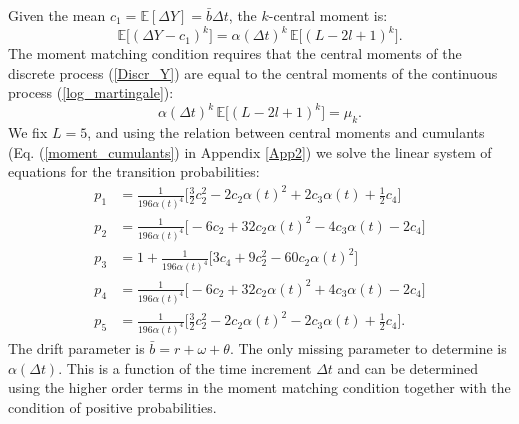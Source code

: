 \documentclass[]{interact}
\newcommand{\numberset}{\mathbb}
\newcommand{\E}{\numberset{E}}
\theoremstyle{plain}%
\theoremstyle{definition}
\theoremstyle{remark}
\begin{document}
Given the mean $c_1 = \E[\Delta Y] = \bar b \Delta t$, the $k$-central moment is:
\begin{equation}\label{higher_moments}
 \E \bigl[ (\Delta Y - c_1)^k \bigr] = \alpha(\Delta t)^k\, \E \bigl[ (L-2l+1)^{k} \bigr].
\end{equation}
The moment matching condition requires that the central moments of the discrete process (\ref{Discr_Y}) 
are equal to the central moments
of the continuous process (\ref{log_martingale}):
\begin{equation}\label{moment_matching}
 \alpha(\Delta t)^k\, \E \bigl[ (L-2l+1)^{k} \bigr] = \mu_k.
\end{equation}
We fix $L=5$, and using the relation between central moments and cumulants (Eq. (\ref{moment_cumulants}) in Appendix \ref{App2}) 
we solve the linear system of equations for the transition probabilities:
\begin{align}\label{probabilities1}
 p_1 &= \frac{1}{196 \alpha(t)^4} \biggl[ \frac{3}{2} c_2^2 -2 c_2\alpha(t)^2 + 2 c_3 \alpha(t) +\frac{1}{2} c_4  \biggr] \\ \nonumber
 p_2 &= \frac{1}{196 \alpha(t)^4} \biggl[ -6 c_2 + 32c_2 \alpha(t)^2 - 4c_3 \alpha(t) -2 c_4 \biggr] \\ \nonumber
 p_3 &=  1 + \frac{1}{196 \alpha(t)^4} \biggl[ 3c_4 + 9c_2^2 -60c_2 \alpha(t)^2   \biggr] \\ \nonumber
 p_4 &= \frac{1}{196 \alpha(t)^4} \biggl[ -6 c_2 + 32c_2 \alpha(t)^2 + 4c_3 \alpha(t) -2 c_4  \biggr] \\ \nonumber
 p_5 &= \frac{1}{196 \alpha(t)^4} \biggl[ \frac{3}{2} c_2^2 -2 c_2\alpha(t)^2 - 2 c_3 \alpha(t) +\frac{1}{2} c_4 \biggr].
\end{align}
The drift parameter is $\bar b = r+\omega + \theta$.
The only missing parameter to determine is $\alpha(\Delta t)$. This is a function of the time increment $\Delta t$ and can be determined using the 
higher order terms in the moment matching condition together with the condition of positive probabilities.
\end{document}

